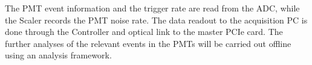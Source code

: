 The PMT event information and the trigger rate are read from the ADC, while the Scaler records the PMT noise rate. The data readout to the acquisition PC is done through the Controller and optical link to the master PCIe card. The further analyses of the relevant events in the PMTs will be carried out offline using an analysis framework.





